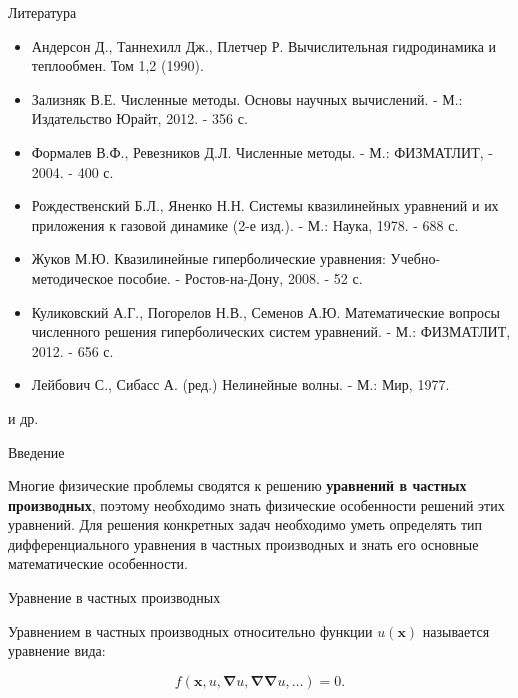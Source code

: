 \documentclass[10pt,xcolor=pst,aspectratio=169]{beamer}
\begin{document}
\begin{frame}{Литература}

    \transdissolve[duration=0.1]

    \begin{itemize}
        \item Андерсон Д., Таннехилл Дж., Плетчер Р. Вычислительная гидродинамика и теплообмен. Том 1,2 (1990).

        \item Зализняк В.Е. Численные методы. Основы научных вычислений. - М.: Издательство Юрайт, 2012. - 356 с.

        \item Формалев В.Ф., Ревезников Д.Л. Численные методы. - М.: ФИЗМАТЛИТ, - 2004. - 400 с.

        \item Рождественский Б.Л., Яненко Н.Н. Системы квазилинейных уравнений и их приложения к газовой динамике (2-е изд.). - М.: Наука, 1978. - 688 с.
        
        \item Жуков М.Ю. Квазилинейные гиперболические уравнения: Учебно-методическое пособие. - Ростов-на-Дону, 2008. - 52 с.

        \item Куликовский А.Г., Погорелов Н.В., Семенов А.Ю. Математические вопросы численного решения гиперболических систем уравнений. - М.: ФИЗМАТЛИТ, 2012. - 656 с.

        \item Лейбович С., Сибасс А. (ред.) Нелинейные волны. - М.: Мир, 1977.
    \end{itemize}

    и др.

\end{frame}

\begin{frame}{Введение}

    \transdissolve[duration=0.1]
    \justifying
    \large

    Многие физические проблемы сводятся к решению \textbf{уравнений в частных производных}, поэтому необходимо знать физические особенности решений этих уравнений. Для решения конкретных задач необходимо уметь определять тип дифференциального уравнения в частных производных и знать его основные математические особенности.

\end{frame}

\begin{frame}{Уравнение в частных производных}

    \transdissolve[duration=0.1]
    \justifying
    \large

    Уравнением в частных производных относительно функции $u \left( \mathbf{x} \right)$ называется уравнение вида:

    \[
        f \left( \mathbf{x}, u, \bm{\nabla} u, \bm{\nabla} \bm{\nabla} u, \ldots \right) = 0.
    \]

\end{frame}
\end{document}
